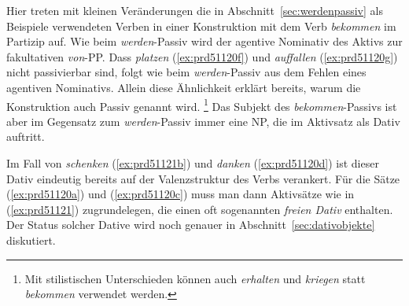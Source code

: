 \begin{exe}
  \ex\label{ex:prd51120} 
  \begin{xlist}
  \end{xlist}
\end{exe}

Hier treten mit kleinen Veränderungen die in Abschnitt~\ref{sec:werdenpassiv} als Beispiele verwendeten Verben in einer Konstruktion mit dem Verb \textit{bekommen} im Partizip auf.
Wie beim \textit{werden}-Passiv wird der agentive Nominativ des Aktivs zur fakultativen \textit{von}-PP.
Dass \textit{platzen} (\ref{ex:prd51120f}) und \textit{auffallen} (\ref{ex:prd51120g}) nicht passivierbar sind, folgt wie beim \textit{werden}-Passiv aus dem Fehlen eines agentiven Nominativs.
Allein diese Ähnlichkeit erklärt bereits, warum die Konstruktion auch Passiv genannt wird.%
\footnote{Mit stilistischen Unterschieden können auch \textit{erhalten} und \textit{kriegen} statt \textit{bekommen} verwendet werden.}
Das Subjekt des \textit{bekommen}-Passivs ist aber im Gegensatz zum \textit{werden}-Passiv immer eine NP, die im Aktivsatz als Dativ auftritt.


Im Fall von \textit{schenken} (\ref{ex:prd51121b}) und \textit{danken} (\ref{ex:prd51120d}) ist dieser Dativ eindeutig bereits auf der Valenzstruktur des Verbs verankert.
Für die Sätze (\ref{ex:prd51120a}) und (\ref{ex:prd51120c}) muss man dann Aktivsätze wie in (\ref{ex:prd51121}) zugrundelegen, die einen oft sogenannten \textit{freien Dativ} enthalten.
Der Status solcher Dative wird noch genauer in Abschnitt~\ref{sec:dativobjekte} diskutiert.

